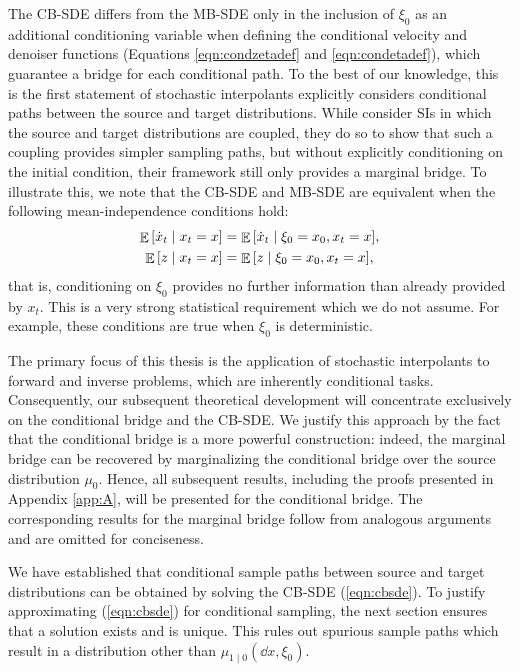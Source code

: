 The CB-SDE differs from the MB-SDE only in the inclusion of \(\xi_{0}\) as an additional conditioning variable when defining the conditional velocity and denoiser functions (Equations \ref{eqn:condzetadef} and \ref{eqn:condetadef}), which guarantee a bridge for each conditional path. To the best of our knowledge, this is the first statement of stochastic interpolants explicitly considers conditional paths between the source and target distributions. While \citet{albergo2023stochastic} consider SIs in which the source and target distributions are coupled, they do so to show that such a coupling provides simpler sampling paths, but without explicitly conditioning on the initial condition, their framework still only provides a marginal bridge. To illustrate this, we note that the CB-SDE and MB-SDE are equivalent when the following mean-independence conditions hold:
\begin{align*}
  \mathop{\mathbb{E}}\qty[\dot{x}_{t} \mid x_{t} = x] &= \mathop{\mathbb{E}}\qty[\dot{x}_{t} \mid \xi_{0} = x_{0}, x_{t} = x], \\
  \mathop{\mathbb{E}}\qty[z \mid x_{t} = x] &= \mathop{\mathbb{E}}\qty[z \mid \xi_{0} = x_{0}, x_{t} = x],
\end{align*}
that is, conditioning on \(\xi_{0}\) provides no further information than already provided by \(x_{t}\). This is a very strong statistical requirement which we do not assume. For example, these conditions are true when \(\xi_{0}\) is deterministic. %

The primary focus of this thesis is the application of stochastic interpolants to forward and inverse problems, which are inherently conditional tasks. Consequently, our subsequent theoretical development will concentrate exclusively on the conditional bridge and the CB-SDE. We justify this approach by the fact that the conditional bridge is a more powerful construction: indeed, the marginal bridge can be recovered by marginalizing the conditional bridge over the source distribution \(\mu_{0}\). Hence, all subsequent results, including the proofs presented in Appendix \ref{app:A}, will be presented for the conditional bridge. The corresponding results for the marginal bridge follow from analogous arguments and are omitted for conciseness.

We have established that conditional sample paths between source and target distributions can be obtained by solving the CB-SDE (\ref{eqn:cbsde}). To justify approximating (\ref{eqn:cbsde}) for conditional sampling, the next section ensures that a solution exists and is unique. This rules out spurious sample paths which result in a distribution other than \(\mu_{1\mid 0}(\dd{x}, \xi_{0})\).

